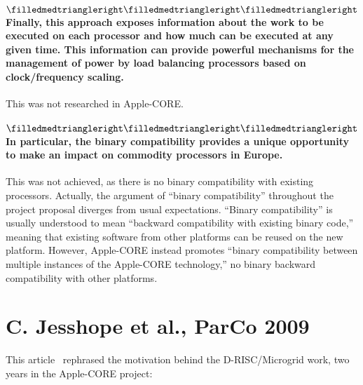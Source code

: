 \paragraph{
$\filledmedtriangleright\filledmedtriangleright\filledmedtriangleright$
Finally, this
approach exposes information about the work to be executed on each
processor and how much can be executed at any given time.
This
information can provide powerful mechanisms for the management of
power by load balancing processors based on clock/frequency
scaling. }
This was not researched in Apple-CORE.

\paragraph{
$\filledmedtriangleright\filledmedtriangleright\filledmedtriangleright$
  In particular, the binary compatibility provides a unique
  opportunity to make an impact on commodity processors in Europe.}
This was not achieved, as there is no binary compatibility with
existing processors. Actually, the argument of ``binary
compatibility'' throughout the project proposal diverges from usual
expectations. ``Binary compatibility'' is usually understood to mean
``backward compatibility with existing binary code,'' meaning that
existing software from other platforms can be reused on the new
platform. However, Apple-CORE instead promotes ``binary compatibility
between multiple instances of the Apple-CORE technology,'' \ie no
binary backward compatibility with other platforms.


\section{C. Jesshope et al., ParCo 2009}

This article~\cite{jesshope.09.parco} rephrased the motivation
behind the D-RISC/Microgrid work, two years in the Apple-CORE project:


